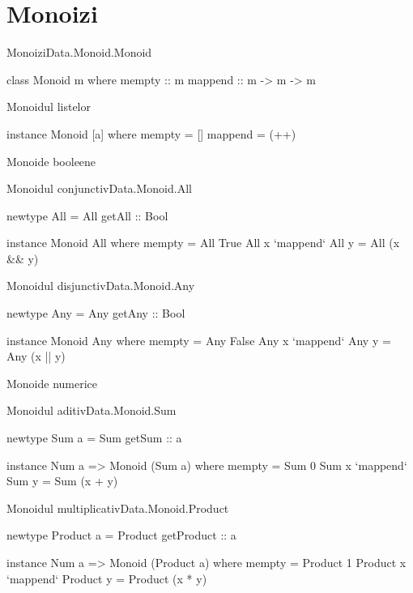 \documentclass[xcolor=pdftex,romanian,colorlinks]{beamer}
\begin{document}
\section{Monoizi}

\begin{frame}[fragile]{Monoizi}{Data.Monoid.Monoid}
\begin{asciihs}
class Monoid m where
    mempty  :: m
    mappend :: m -> m -> m
\end{asciihs}

\begin{block}{Monoidul listelor}
\vspace{-2ex}
\begin{asciihs}
instance Monoid [a] where
    mempty  = []
    mappend = (++)
\end{asciihs}
\end{block}
\end{frame}


\begin{frame}[fragile]{Monoide booleene}
\begin{block}{Monoidul conjunctiv\hfill Data.Monoid.All}
\vspace{-2ex}
\begin{asciihs}
newtype All = All { getAll :: Bool }

instance Monoid All where
        mempty = All True
        All x `mappend` All y = All (x && y)
\end{asciihs}
\end{block}
\begin{block}{Monoidul disjunctiv\hfill Data.Monoid.Any}
\vspace{-2ex}
\begin{asciihs}
newtype Any = Any { getAny :: Bool }

instance Monoid Any where
        mempty = Any False
        Any x `mappend` Any y = Any (x || y)
\end{asciihs}
\end{block}
\end{frame}


\begin{frame}[fragile]{Monoide numerice}
\begin{block}{Monoidul aditiv\hfill Data.Monoid.Sum}
\vspace{-2ex}
\begin{asciihs}
newtype Sum a = Sum { getSum :: a }

instance Num a => Monoid (Sum a) where
        mempty = Sum 0
        Sum x `mappend` Sum y = Sum (x + y)
\end{asciihs}
\end{block}
\begin{block}{Monoidul multiplicativ\hfill Data.Monoid.Product}
\vspace{-2ex}
\begin{asciihs}
newtype Product a = Product { getProduct :: a }

instance Num a => Monoid (Product a) where
        mempty = Product 1
        Product x `mappend` Product y = Product (x * y)
\end{asciihs}
\end{block}
\end{frame}
\end{document}
